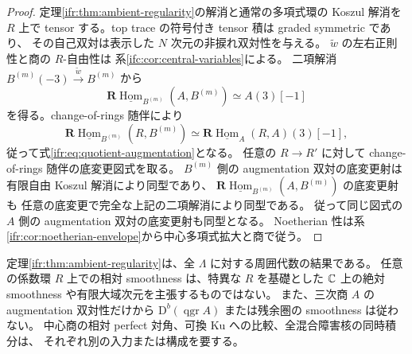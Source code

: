 \begin{proof}
定理\ref{ifr:thm:ambient-regularity}の解消と通常の多項式環の Koszul 解消を
$R$ 上で tensor する。top trace の符号付き tensor 積は graded symmetric であり、
その自己双対は表示した $N$ 次元の非捩れ双対性を与える。
$\widetilde w$ の左右正則性と商の $R$-自由性は
系\ref{ifc:cor:central-variables}による。
二項解消 $B^{(m)}(-3)\xrightarrow{\widetilde w}B^{(m)}$ から
\[
 \mathbf R\underline{\operatorname{Hom}}_{B^{(m)}}(A,B^{(m)})
                    \simeq A(3)[-1]
\]
を得る。change-of-rings 随伴により
\[
 \mathbf R\underline{\operatorname{Hom}}_{B^{(m)}}(R,B^{(m)})
   \simeq
 \mathbf R\underline{\operatorname{Hom}}_A(R,A)(3)[-1],
\]
従って式\eqref{ifr:eq:quotient-augmentation}となる。
任意の $R\to R'$ に対して change-of-rings 随伴の底変更図式を取る。
$B^{(m)}$ 側の augmentation 双対の底変更射は有限自由 Koszul 解消により同型であり、
$\mathbf R\underline{\operatorname{Hom}}_{B^{(m)}}(A,B^{(m)})$ の底変更射も
任意の底変更で完全な上記の二項解消により同型である。
従って同じ図式の $A$ 側の augmentation 双対の底変更射も同型となる。
Noetherian 性は系\ref{ifr:cor:noetherian-envelope}から中心多項式拡大と商で従う。
\end{proof}

\begin{remark}[相対結論と射影中心商の滑らかさの区別]
\label{ifr:rem:scope}
定理\ref{ifr:thm:ambient-regularity}は、全 $\Lambda$ に対する周囲代数の結果である。
任意の係数環 $R$ 上での相対 smoothness は、特異な $R$ を基礎とした
$\mathbb C$ 上の絶対 smoothness や有限大域次元を主張するものではない。
また、三次商 $A$ の augmentation 双対性だけから
$\mathrm D^b(\operatorname{qgr}A)$ または残余圏の smoothness は従わない。
中心商の相対 perfect 対角、可換 Ku への比較、全混合障害核の同時積分は、
それぞれ別の入力または構成を要する。
\end{remark}
